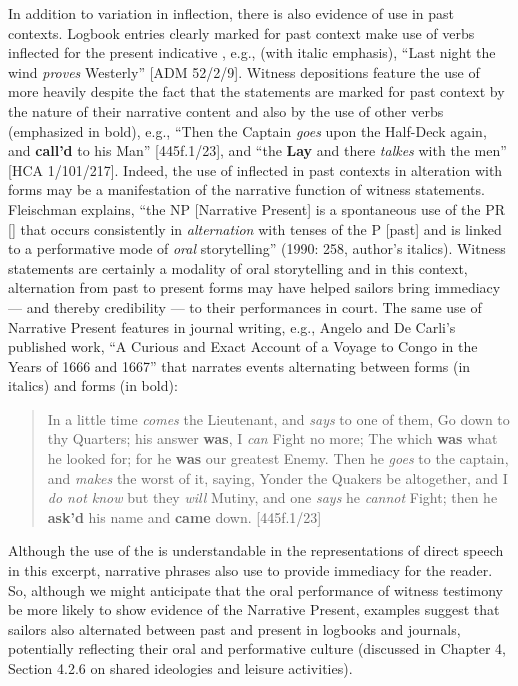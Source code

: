 In addition to variation in  inflection, there is also evidence of  use in past contexts. Logbook entries clearly marked for past context make use of verbs inflected for the present indicative , e.g., (with italic emphasis), “Last night the wind \textit{proves} Westerly” [ADM 52/2/9]. Witness depositions feature the use of  more heavily despite the fact that the statements are marked for past context by the nature of their narrative content and also by the use of other  verbs (emphasized in bold), e.g., “Then the Captain \textit{goes} upon the Half-Deck again, and \textbf{call’d} to his Man” [445f.1/23], and “the  \textbf{Lay} and there \textit{talkes} with the men” [HCA 1/101/217]. Indeed, the use of inflected  in past contexts in alteration with  forms may be a manifestation of the narrative function of witness statements. Fleischman explains, “the NP [Narrative Present] is a spontaneous use of the PR [] that occurs consistently in \textit{alternation} with tenses of the P [past] and is linked to a performative mode of \textit{oral} storytelling” (1990: 258, author’s italics). Witness statements are certainly a modality of oral storytelling and in this context, alternation from past to present forms may have helped sailors bring immediacy — and thereby credibility — to their performances in court. The same use of Narrative Present  features in journal writing, e.g., Angelo and De Carli’s published work, “A Curious and Exact Account of a Voyage to Congo in the Years of 1666 and 1667” that narrates events alternating between  forms (in italics) and  forms (in bold):

\begin{quotation}
In a little time \textit{comes} the Lieutenant, and \textit{says} to one of them, Go down to thy Quarters; his answer \textbf{was}, I \textit{can} Fight no more; The which \textbf{was} what he looked for; for he \textbf{was} our greatest Enemy. Then he \textit{goes} to the captain, and \textit{makes} the worst of it, saying, Yonder the Quakers be altogether, and I \textit{do not know} but they \textit{will} Mutiny, and one \textit{says} he \textit{cannot} Fight; then he \textbf{ask’d} his name and \textbf{came} down. [445f.1/23]
\end{quotation}

Although the use of the  is understandable in the representations of direct speech in this excerpt, narrative phrases also use  to provide immediacy for the reader. So, although we might anticipate that the oral performance of witness testimony be more likely to show evidence of the Narrative Present, examples suggest that sailors also alternated between past and present in logbooks and journals, potentially reflecting their oral and performative culture (discussed in Chapter 4, Section 4.2.6 on shared ideologies and leisure activities). 

